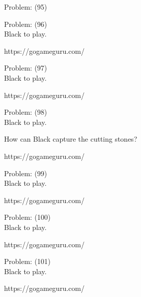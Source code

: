 \documentclass[11pt]{article}
\begin{document}
\begin{minipage}[t]{0.5\textwidth}
  {\centering
  
  Problem: (95)\\
  
  }
\end{minipage}
\begin{minipage}[t]{0.5\textwidth}
  {\centering
  
  Problem: (96)\\
  Black to play.

https://gogameguru.com/\\
  }
\end{minipage}
\begin{minipage}[t]{0.5\textwidth}
  {\centering
  
  Problem: (97)\\
  Black to play.

https://gogameguru.com/\\
  }
\end{minipage}
\begin{minipage}[t]{0.5\textwidth}
  {\centering
  
  Problem: (98)\\
  Black to play.

How can Black capture the cutting stones?

https://gogameguru.com/\\
  }
\end{minipage}
\begin{minipage}[t]{0.5\textwidth}
  {\centering
  
  Problem: (99)\\
  Black to play.

https://gogameguru.com/\\
  }
\end{minipage}
\begin{minipage}[t]{0.5\textwidth}
  {\centering
  
  Problem: (100)\\
  Black to play.

https://gogameguru.com/\\
  }
\end{minipage}
\begin{minipage}[t]{0.5\textwidth}
  {\centering
  
  Problem: (101)\\
  Black to play.

https://gogameguru.com/\\
  }
\end{minipage}
\end{document}
